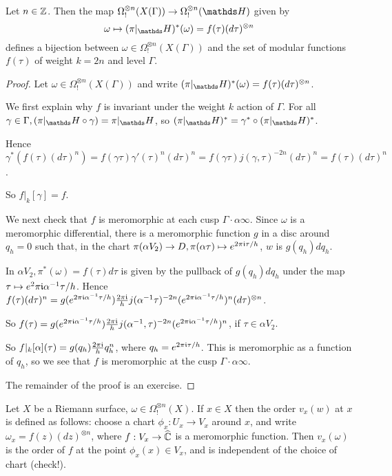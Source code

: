 \documentclass[10pt,a4paper]{article}
\begin{document}
\begin{proposition}
  Let $n \in \mathbb{Z}$. Then the map $\Omega_!^{\otimes n}(X(\Gamma)) \to \Omega^{\otimes n}_!(\H)$ given by
  \[\omega \mapsto (\pi|_\H)^\ast(\omega) = f(\tau)(d\tau)^{\otimes n}\]
  defines a bijection between $\omega \in \Omega^{\otimes n}_!(X(\Gamma))$ and the set of modular functions $f(\tau)$ of weight $k=2n$ and level $\Gamma$.
\end{proposition}
\begin{proof}
  Let $\omega \in \Omega_!^{\otimes n}(X(\Gamma))$ and write $(\pi|_\H)^\ast(\omega) = f(\tau)(d\tau)^{\otimes n}$.

  We first explain why $f$ is invariant under the weight $k$ action of $\Gamma$. For all $\gamma \in\Gamma, (\pi|_\H \circ \gamma) = \pi|_\H$, so $(\pi|_\H)^\ast = \gamma^\ast \circ (\pi|_\H)^\ast$.

  Hence $\gamma^\ast(f(\tau)(d\tau)^n) = f(\gamma \tau)\gamma'(\tau)^n(d\tau)^n = f(\gamma\tau)j(\gamma,\tau)^{-2n}(d\tau)^n=f(\tau)(d\tau)^n$.

  So $f|_k[\gamma] = f$.

  We next check that $f$ is meromorphic at each cusp $\Gamma \cdot \alpha \infty$. Since $\omega$ is a meromorphic differential, there is a meromorphic function $g$ in a disc around $q_h = 0$ such that, in the chart $\pi(\alpha V_2) \to D, \pi(\alpha \tau)\mapsto e^{2\pi\mathfrak{i}\tau/h}$, $w$ is $g(q_h)dq_h$.

  In $\alpha V_2, \pi^\ast(\omega) = f(\tau)d\tau$ is given by the pullback of $g(q_h)dq_h$ under the map $\tau \mapsto e{^2\pi\mathfrak{i}\alpha^{-1}\tau/h}$. Hence $f(\tau)(d\tau)^n = g(e^{2\pi\mathfrak{i}\alpha^{-1}\tau/h})\frac{2\pi\mathfrak{i}}{h}j(\alpha^{-1}\tau)^{-2n}(e^{2\pi\mathfrak{i}\alpha^{-1}\tau/h})^n(d\tau)^{\otimes n}$.

  So $f(\tau) = g(e^{2\pi\mathfrak{i}\alpha^{-1}\tau/h})\frac{2\pi\mathfrak{i}}{h}j(\alpha^{-1},\tau)^{-2n}(e^{2\pi\mathfrak{i}\alpha^{-1}\tau/h})^n$, if $\tau \in \alpha V_2$.

  So $f|_k[\alpha](\tau) = g(q_h)\frac{2\pi\mathfrak{i}}{h}q_h^n$, where $q_h = e^{2\pi\mathfrak{i}\tau/h}$. This is meromorphic as a function of $q_h$, so we see that $f$ is meromorphic at the cusp $\Gamma\cdot\alpha\infty$.

  The remainder of the proof is an exercise.
\end{proof}
\begin{definition}
  Let $X$ be a Riemann surface, $\omega \in \Omega^{\otimes n}_!(X)$. If $x \in X$ then the order $v_x(w)$ at $x$ is defined as follows: choose a chart $\phi_x: U_x \to V_x$ around $x$, and write $\omega_x = f(z)(dz)^{\otimes n}$, where $f:V_x \to \widehat{\mathbb{C}}$ is a meromorphic function. Then $v_x(\omega)$ is the order of $f$ at the point $\phi_x(x)\in V_x$, and is independent of the choice of chart (check!).
\end{definition}
\end{document}
